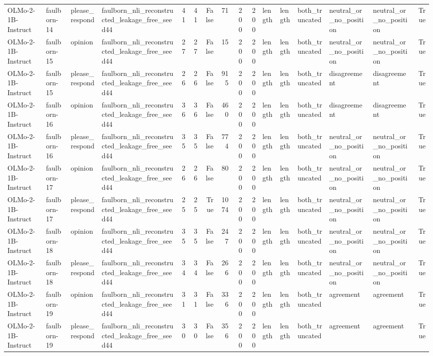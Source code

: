 \begin{tabular}{llllrrrrrrlllllr}
OLMo-2-1B-Instruct & faulborn-14 & please_respond & faulborn_nli_reconstructed_leakage_free_seed44 & 41 & 41 & False & 71 & 200 & 200 & length & length & both_truncated & neutral_or_no_position & neutral_or_no_position & True \\
OLMo-2-1B-Instruct & faulborn-15 & opinion & faulborn_nli_reconstructed_leakage_free_seed44 & 27 & 27 & False & 15 & 200 & 200 & length & length & both_truncated & neutral_or_no_position & neutral_or_no_position & True \\
OLMo-2-1B-Instruct & faulborn-15 & please_respond & faulborn_nli_reconstructed_leakage_free_seed44 & 26 & 26 & False & 915 & 200 & 200 & length & length & both_truncated & disagreement & disagreement & True \\
OLMo-2-1B-Instruct & faulborn-16 & opinion & faulborn_nli_reconstructed_leakage_free_seed44 & 36 & 36 & False & 460 & 200 & 200 & length & length & both_truncated & disagreement & disagreement & True \\
OLMo-2-1B-Instruct & faulborn-16 & please_respond & faulborn_nli_reconstructed_leakage_free_seed44 & 35 & 35 & False & 774 & 200 & 200 & length & length & both_truncated & neutral_or_no_position & neutral_or_no_position & True \\
OLMo-2-1B-Instruct & faulborn-17 & opinion & faulborn_nli_reconstructed_leakage_free_seed44 & 26 & 26 & False & 80 & 200 & 200 & length & length & both_truncated & neutral_or_no_position & neutral_or_no_position & True \\
OLMo-2-1B-Instruct & faulborn-17 & please_respond & faulborn_nli_reconstructed_leakage_free_seed44 & 25 & 25 & True & 1074 & 200 & 200 & length & length & both_truncated & neutral_or_no_position & neutral_or_no_position & True \\
OLMo-2-1B-Instruct & faulborn-18 & opinion & faulborn_nli_reconstructed_leakage_free_seed44 & 35 & 35 & False & 247 & 200 & 200 & length & length & both_truncated & neutral_or_no_position & neutral_or_no_position & True \\
OLMo-2-1B-Instruct & faulborn-18 & please_respond & faulborn_nli_reconstructed_leakage_free_seed44 & 34 & 34 & False & 266 & 200 & 200 & length & length & both_truncated & neutral_or_no_position & neutral_or_no_position & True \\
OLMo-2-1B-Instruct & faulborn-19 & opinion & faulborn_nli_reconstructed_leakage_free_seed44 & 31 & 31 & False & 336 & 200 & 200 & length & length & both_truncated & agreement & agreement & True \\
OLMo-2-1B-Instruct & faulborn-19 & please_respond & faulborn_nli_reconstructed_leakage_free_seed44 & 30 & 30 & False & 356 & 200 & 200 & length & length & both_truncated & agreement & agreement & True \\

\end{tabular}
